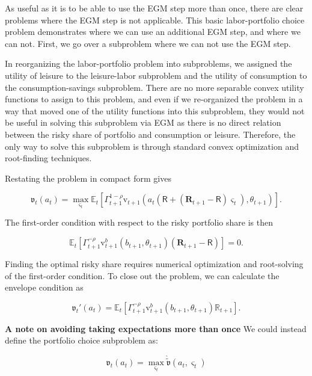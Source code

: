 \documentclass{article}
\newcommand{\tShkEmp}{\theta}
\newcommand{\Ex}{\mathbb{E}}
\newcommand{\CRRA}{\rho}
\newcommand{\bRat}{b}
\newcommand{\vFunc}{\mathrm{v}}
\newcommand{\Rfree}{\mathsf{R}}
\newcommand{\riskyshare}{\varsigma}
\newcommand{\PGro}{\Gamma}
\newcommand{\aRat}{a}
\newcommand{\Rport}{\mathbb{R}}
\newcommand{\Risky}{\mathbf{R}}
\newcommand{\vEnd}{\mathfrak{v}}
\newcommand{\vOptAlt}{\grave{\tilde{\mathfrak{v}}}}
\begin{document}
As useful as it is to be able to use the EGM step more than once, there are clear problems where the EGM step is not applicable. This basic labor-portfolio choice problem demonstrates where we can use an additional EGM step, and where we can not. First, we go over a subproblem where we can not use the EGM step.

In reorganizing the labor-portfolio problem into subproblems, we assigned the utility of leisure to the leisure-labor subproblem and the utility of consumption to the consumption-savings subproblem. There are no more separable convex utility functions to assign to this problem, and even if we re-organized the problem in a way that moved one of the utility functions into this subproblem, they would not be useful in solving this subproblem via EGM as there is no direct relation between the risky share of portfolio and consumption or leisure. Therefore, the only way to solve this subproblem is through standard convex optimization and root-finding techniques.

Restating the problem in compact form gives

\begin{equation}
\vEnd_{t}(\aRat_{t}) = \max_{\riskyshare_{t}}  \Ex_{t} \left[ \PGro_{t+1}^{1-\CRRA}
  \vFunc_{t+1}\left(\aRat_{t}(\Rfree + (\Risky_{t+1} - \Rfree) \riskyshare_{t}), \tShkEmp_{t+1}\right)
  \right].
\end{equation}

The first-order condition with respect to the risky portfolio share is then

\begin{equation}
\Ex_{t} \left[ \PGro_{t+1}^{-\CRRA} \vFunc_{t+1}^{\bRat}\left(\bRat_{t+1}, \tShkEmp_{t+1}\right) (\Risky_{t+1} - \Rfree)  \right] = 0.
\end{equation}

Finding the optimal risky share requires numerical optimization and root-solving of the first-order condition. To close out the problem, we can calculate the envelope condition as

\begin{equation}
\vEnd_{t}'(\aRat_{t}) =  \Ex_{t} \left[ \PGro_{t+1}^{-\CRRA} \vFunc_{t+1}^{\bRat}\left(\bRat_{t+1}, \tShkEmp_{t+1}\right) \Rport_{t+1}  \right].
\end{equation}

\textbf{A note on avoiding taking expectations more than once} We could instead define the portfolio choice subproblem as:

\begin{equation}
\vEnd_{t}(\aRat_{t}) = \max_{\riskyshare_{t}} \vOptAlt(\aRat_{t}, \riskyshare_{t})
\end{equation}
\end{document}
